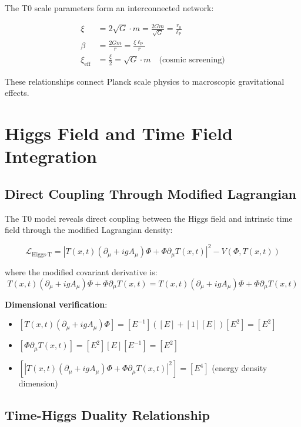 \documentclass[12pt,a4paper]{article}
\newcommand{\Tfieldt}{T(x,t)}
\newcommand{\DhiggsTt}{\Tfieldt (\partial_\mu + ig A_\mu) \Phi + \Phi \partial_\mu \Tfieldt}
\newcommand{\lP}{\ell_{\text{P}}}
\begin{document}
	The T0 scale parameters form an interconnected network:
	
	\begin{align}
		\xi &= 2\sqrt{G} \cdot m = \frac{2Gm}{\sqrt{G}} = \frac{r_0}{\lP} \\
		\beta &= \frac{2Gm}{r} = \frac{\xi \lP}{r} \\
		\xi_{\text{eff}} &= \frac{\xi}{2} = \sqrt{G} \cdot m \quad \text{(cosmic screening)}
		\label{eq:parameter_network}
	\end{align}
	
	These relationships connect Planck scale physics to macroscopic gravitational effects.
	
	\section{Higgs Field and Time Field Integration}
	\label{sec:higgs_time_integration}
	
	\subsection{Direct Coupling Through Modified Lagrangian}
	\label{subsec:direct_coupling}
	
	The T0 model reveals direct coupling between the Higgs field and intrinsic time field through the modified Lagrangian density:
	
	\begin{equation}
		\mathcal{L}_{\text{Higgs-T}} = |\DhiggsTt|^2 - V(\Phi, \Tfieldt)
		\label{eq:higgs_time_lagrangian}
	\end{equation}
	
	where the modified covariant derivative is:
	\begin{equation}
		\DhiggsTt = \Tfieldt (\partial_\mu + ig A_\mu) \Phi + \Phi \partial_\mu \Tfieldt
		\label{eq:modified_covariant_derivative}
	\end{equation}
	
	\textbf{Dimensional verification}:
	\begin{itemize}
		\item $[\Tfieldt (\partial_\mu + ig A_\mu) \Phi] = [E^{-1}]([E] + [1][E])[E^2] = [E^2]$
		\item $[\Phi \partial_\mu \Tfieldt] = [E^2][E][E^{-1}] = [E^2]$
		\item $[|\DhiggsTt|^2] = [E^4]$ (energy density dimension) \checkmark
	\end{itemize}
	
	\subsection{Time-Higgs Duality Relationship}
	\label{subsec:time_higgs_duality}
	
\end{document}
